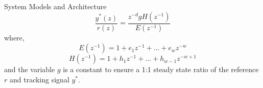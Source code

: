 \begin{section}{System Models and Architecture}
	\begin{equation}
	\label{eq:reference model_z}
	\frac{y^*(z)}{r(z)}=\frac{z^{-d}gH(z^{-1})}{E(z^{-1})}
	\end{equation}
where,
    \begin{equation}
    \label{eq:E_q}
	E(z^{-1})=1+e_1z^{-1}+ \dots +e_wz^{-w}
	\end{equation}
	\begin{equation}
	H(z^{-1})=1+h_1z^{-1}+ \dots +h_{w-1}z^{-w+1}
	\end{equation}
and the variable $g$ is a constant to ensure a 1:1 steady state ratio of the reference $r$ and tracking signal $y^*$. 



\end{section}